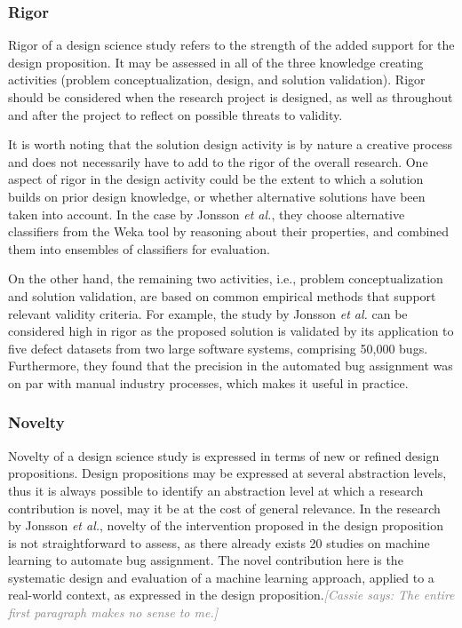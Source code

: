 \documentclass[graybox]{svmult}
\newcommand{\cassie}[1]{\textcolor{gray}{{\it [Cassie says: #1]}}}
\newcommand{\cassie}[1]{}
\begin{document}
\subsubsection{Rigor} 
Rigor of a design science study refers to the strength of the added support for the design proposition. It may be assessed in all of the three knowledge creating activities (problem conceptualization, design, and solution validation). 
Rigor should be considered when the research project is designed, as well as throughout and after the project to reflect on possible threats to validity. 

It is worth noting that the solution design activity is by nature a creative process and does not necessarily have to add to the rigor of the overall research. One aspect of rigor in the design activity could be the extent to which a solution builds on prior design knowledge, or whether alternative solutions have been taken into account. 
In the case by Jonsson \emph{et al.}, they choose alternative classifiers from the Weka tool by reasoning about their properties, and combined them into ensembles of classifiers for evaluation.

On the other hand, the remaining two activities, i.e., problem conceptualization and solution validation, are based on common empirical methods that support relevant validity criteria. For example, the study by Jonsson \emph{et al.} can be considered high in rigor as the proposed solution is validated by its application to five defect datasets from two large software systems, comprising 50,000 bugs. Furthermore, they found that the precision in the automated bug assignment was on par with manual industry processes, which makes it useful in practice.

\subsubsection{Novelty} 
Novelty of a design science study is expressed in terms of new or refined design propositions. Design propositions may be expressed at several abstraction levels, thus it is always possible to identify an abstraction level at which a research contribution is novel, may it be at the cost of general relevance. In the research by Jonsson \emph{et al.}, novelty of the intervention proposed in the design proposition is not straightforward to assess, as there already exists 20 studies on machine learning to automate bug assignment. The novel contribution here is the systematic design and evaluation of a machine learning approach, applied to a real-world context, as expressed in the design proposition.\cassie{The entire first paragraph makes no sense to me.}
\end{document}

